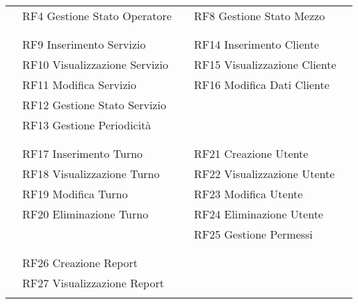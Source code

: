\documentclass[green, fancy, 11pt]{elegantbook}
\begin{document}
\begin{center}
\begin{tabular}{|p{0.2cm} p{2.5cm} p{2cm} p{0.2cm} p{2.5cm} p{1cm} p{0.2cm}|}
	&\multicolumn{2}{|l|}{RF4 Gestione Stato Operatore}&&\multicolumn{2}{|l|}{RF8  Gestione Stato Mezzo}&\\
	\cline{5-6}
	\cline{2-3}
	&&&&&&\\
	\cline{2-3} \cline{5-6}
	&\multicolumn{2}{|l|}{\cellcolor{RussianGreen}{\textcolor{white}{GESTIONE SERVIZI}}}&&\multicolumn{2}{|l|}{\cellcolor{RussianGreen}{\textcolor{white}{GESTIONE CLIENTI}}}&\\
	\cline{2-3} \cline{5-6}
	&\multicolumn{2}{|l|}{RF9 Inserimento Servizio}&&\multicolumn{2}{|l|}{RF14 Inserimento Cliente}&\\
	&\multicolumn{2}{|l|}{RF10 Visualizzazione Servizio}&&\multicolumn{2}{|l|}{RF15 Visualizzazione Cliente}&\\
	&\multicolumn{2}{|l|}{RF11 Modifica Servizio}&&\multicolumn{2}{|l|}{RF16 Modifica Dati Cliente}&\\
	\cline{5-6}
	&\multicolumn{2}{|l|}{RF12 Gestione Stato Servizio}&&&&\\
	&\multicolumn{2}{|l|}{RF13 Gestione Periodicità}&&&&\\
	\cline{2-3}
	&&&&&&\\
	\cline{2-3} \cline{5-6}
	&\multicolumn{2}{|l|}{\cellcolor{RussianGreen}{\textcolor{white}{GESTIONE TURNI}}}&&\multicolumn{2}{|l|}{\cellcolor{RussianGreen}{\textcolor{white}{GESTIONE UTENTI}}}&\\
	\cline{2-3} \cline{5-6}
	&\multicolumn{2}{|l|}{RF17 Inserimento Turno}&&\multicolumn{2}{|l|}{RF21 Creazione Utente}&\\
	&\multicolumn{2}{|l|}{RF18 Visualizzazione Turno}&&\multicolumn{2}{|l|}{RF22 Visualizzazione Utente}&\\
	&\multicolumn{2}{|l|}{RF19 Modifica Turno}&&\multicolumn{2}{|l|}{RF23 Modifica Utente}&\\
	&\multicolumn{2}{|l|}{RF20 Eliminazione Turno}&&\multicolumn{2}{|l|}{RF24 Eliminazione Utente}&\\
	\cline{2-3}
	&&&&\multicolumn{2}{|l|}{RF25 Gestione Permessi}&\\ 
	\cline{5-6}
	&&&&&&\\
	\cline{2-3}
	&\multicolumn{2}{|l|}{\cellcolor{RussianGreen}{\textcolor{white}{GESTIONE REPORT}}}&&&&\\
	\cline{2-3}
	&\multicolumn{2}{|l|}{RF26 Creazione Report}&&&&\\
	&\multicolumn{2}{|l|}{RF27 Visualizzazione Report}&&&&\\
	\cline{2-3}
	&&&&&&\\
	\hline
\end{tabular}


\end{center}
\end{document}
